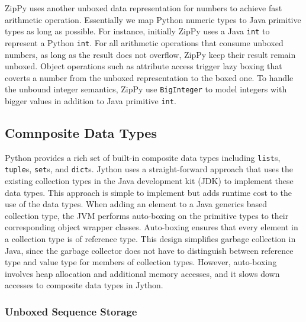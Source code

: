 ZipPy uses another unboxed data representation for numbers to achieve fast arithmetic operation.
Essentially we map Python numeric types to Java primitive types as long as possible.
For instance, initially ZipPy uses a Java \texttt{int} to represent a Python \texttt{int}.
For all arithmetic operations that consume unboxed numbers, as long as the result does not overflow, ZipPy keep their result remain unboxed.
Object operations such as attribute access trigger lazy boxing that coverts a number from the unboxed representation to the boxed one.
To handle the unbound integer semantics, ZipPy use \texttt{BigInteger} to model integers with bigger values in addition to Java primitive \texttt{int}.

\subsection{Comnposite Data Types}

Python provides a rich set of built-in composite data types including \texttt{list}s, \texttt{tuple}s, \texttt{set}s, and \texttt{dict}s.
Jython uses a straight-forward approach that uses the existing collection types in the Java development kit (JDK) to implement these data types.
This approach is simple to implement but adds runtime cost to the use of the data types.
When adding an element to a Java generics based collection type, the JVM performs auto-boxing on the primitive types to their corresponding object wrapper classes.
Auto-boxing ensures that every element in a collection type is of reference type.
This design simplifies garbage collection in Java, since the garbage collector does not have to distinguish between reference type and value type for members of collection types.
However, auto-boxing involves heap allocation and additional memory accesses, and it slows down accesses to composite data types in Jython.

\subsubsection{Unboxed Sequence Storage}

